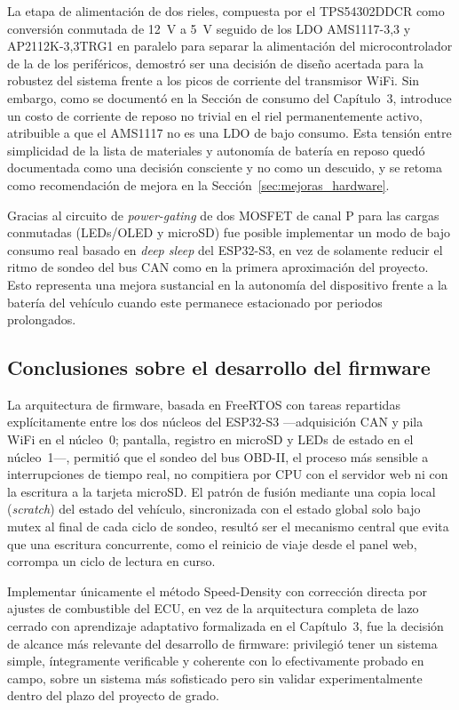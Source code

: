 La etapa de alimentación de dos rieles, compuesta por el TPS54302DDCR como conversión conmutada de 12~V a 5~V seguido de los LDO AMS1117-3,3 y AP2112K-3,3TRG1 en paralelo para separar la alimentación del microcontrolador de la de los periféricos, demostró ser una decisión de diseño acertada para la robustez del sistema frente a los picos de corriente del transmisor WiFi. Sin embargo, como se documentó en la Sección de consumo del Capítulo~3, introduce un costo de corriente de reposo no trivial en el riel permanentemente activo, atribuible a que el AMS1117 no es una LDO de bajo consumo. Esta tensión entre simplicidad de la lista de materiales y autonomía de batería en reposo quedó documentada como una decisión consciente y no como un descuido, y se retoma como recomendación de mejora en la Sección~\ref{sec:mejoras_hardware}.

Gracias al circuito de \textit{power-gating} de dos MOSFET de canal P para las cargas conmutadas (LEDs/OLED y microSD) fue posible implementar un modo de bajo consumo real basado en \textit{deep sleep} del ESP32-S3, en vez de solamente reducir el ritmo de sondeo del bus CAN como en la primera aproximación del proyecto. Esto representa una mejora sustancial en la autonomía del dispositivo frente a la batería del vehículo cuando este permanece estacionado por periodos prolongados.

\subsection{Conclusiones sobre el desarrollo del firmware}

La arquitectura de firmware, basada en FreeRTOS con tareas repartidas explícitamente entre los dos núcleos del ESP32-S3 —adquisición CAN y pila WiFi en el núcleo~0; pantalla, registro en microSD y LEDs de estado en el núcleo~1—, permitió que el sondeo del bus OBD-II, el proceso más sensible a interrupciones de tiempo real, no compitiera por CPU con el servidor web ni con la escritura a la tarjeta microSD. El patrón de fusión mediante una copia local (\textit{scratch}) del estado del vehículo, sincronizada con el estado global solo bajo mutex al final de cada ciclo de sondeo, resultó ser el mecanismo central que evita que una escritura concurrente, como el reinicio de viaje desde el panel web, corrompa un ciclo de lectura en curso.

Implementar únicamente el método Speed-Density con corrección directa por ajustes de combustible del ECU, en vez de la arquitectura completa de lazo cerrado con aprendizaje adaptativo formalizada en el Capítulo~3, fue la decisión de alcance más relevante del desarrollo de firmware: privilegió tener un sistema simple, íntegramente verificable y coherente con lo efectivamente probado en campo, sobre un sistema más sofisticado pero sin validar experimentalmente dentro del plazo del proyecto de grado.

